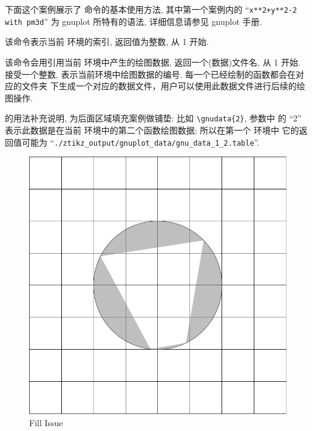\documentclass[
  hyper, lang=cn, 
  class=l3dox, 
]{../../zlatex/code/ztex}
\begin{document}
下面这个案例展示了  命令的基本使用方法, 其中第一个案例内的 ``\texttt{x**2+y**2-2 with pm3d}'' 
为 gnuplot 所特有的语法, 详细信息请参见 gnuplot 手册.



\begin{function}[added=2025-05-15]{\currentTikzIndex}
  该命令表示当前  环境的索引, 返回值为整数, 从 1 开始.
\end{function}


\begin{function}[added=2025-05-15]{\gnudata}
  \begin{syntax}
  \end{syntax}
  该命令会用引用当前  环境中产生的绘图数据, 返回一个(数据)文件名, 从 1 开始.
   接受一个整数, 表示当前环境中绘图数据的编号. 每一个已经绘制的函数都会在对应的文件夹
  下生成一个对应的数据文件，用户可以使用此数据文件进行后续的绘图操作.
\end{function}

\cmd{\gnudata} 的用法补充说明, 为后面区域填充案例做铺垫: 比如 \verb|\gnudata{2}|, 参数中
的 ``2'' 表示此数据是在当前  环境中的第二个函数绘图数据; 所以在第一个  环境中
它的返回值可能为 ``\texttt{./ztikz_output/gnuplot_data/gnu_data_1_2.table}''.

\begin{figure}[!htb]
  \centering
  \includegraphics[width=.5\linewidth]{./support//pics/contour_data_bug.pdf}
  \caption{ Fill Issue}
  \label{fig:contour-fill-bug}
\end{figure}
\end{document}
